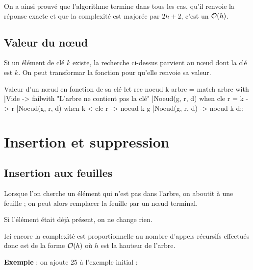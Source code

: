  On a ainsi prouvé que l'algorithme termine dans tous les cas, qu'il renvoie la réponse exacte et que la complexité est majorée par $2h+2$, c'est un ${\cal O}(h)$.
\subsection{Valeur du nœud}
Si un élément de clé $k$ existe, la recherche ci-dessus parvient au nœud dont la clé est $k$. On peut transformar la fonction pour qu'elle renvoie sa valeur.
\begin{code}{Valeur d'un nœud en fonction de sa clé}
let rec noeud k arbre = 
  match arbre with
  |Vide -> failwith "L'arbre ne contient pas la clé"
  |Noeud(g, r, d) when cle r = k -> r
  |Noeud(g, r, d) when k < cle r -> noeud k g
  |Noeud(g, r, d) -> noeud k d;;
\end{code}
\section{Insertion et suppression}
\subsection{Insertion aux feuilles}
Lorsque l'on cherche un élément qui n'est pas dans l'arbre, on aboutit à une feuille ; on peut alors remplacer la feuille par un nœud terminal.

Si l'élément était déjà présent, on ne change rien.

\medskip

Ici encore la complexité est proportionnelle au nombre d'appels récursifs effectués donc est de la forme ${\cal O}(h)$ où $h$ est la hauteur de l'arbre.

{\bf Exemple} : on ajoute 25 à l'exemple initial :

